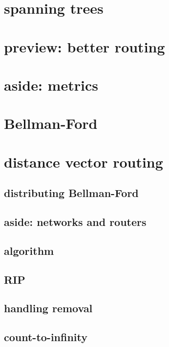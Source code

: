 \section{spanning trees}


\section{preview: better routing}


\section{aside: metrics}


\section{Bellman-Ford}


\section{distance vector routing}
\subsection{distributing Bellman-Ford}


\subsection{aside: networks and routers}
 

\subsection{algorithm}


\subsection{RIP}



\subsection{handling removal}

\subsection{count-to-infinity}

